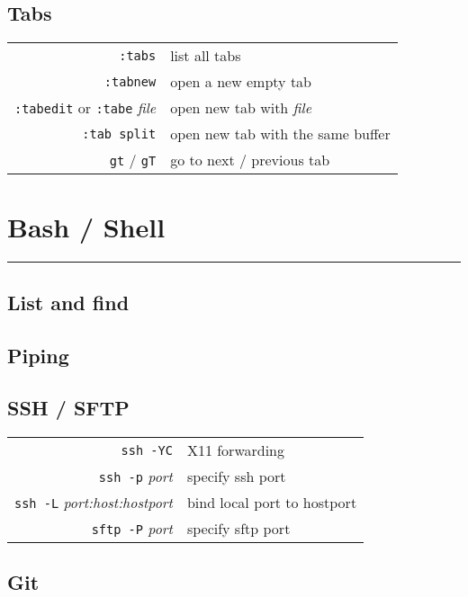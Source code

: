 \begin{multicols*}{3}
\subsection*{Tabs}
\begin{tabular}{@{}rl@{}}
  \verb|:tabs| & list all tabs \\
  \verb|:tabnew| & open a new empty tab \\
  \verb|:tabedit| or \verb|:tabe| \itshape{file} & open new tab with \itshape{file} \\
  \verb|:tab split| & open new tab with the same buffer \\
  \verb|gt| / \verb|gT| & go to next / previous tab
\end{tabular}

\section*{Bash / Shell}
\hrule\vspace*{2pt}
\subsection*{List and find}
\subsection*{Piping}
\subsection*{SSH / SFTP}
\begin{tabular}{@{}rl@{}}
  \verb|ssh -YC| & X11 forwarding \\
  \verb|ssh -p| \itshape{port} & specify ssh port \\
  \verb|ssh -L| \itshape{port:host:hostport} & bind local port to hostport \\
  \verb|sftp -P| \itshape{port} & specify sftp port
\end{tabular}
\subsection*{Git}

\end{multicols*}


